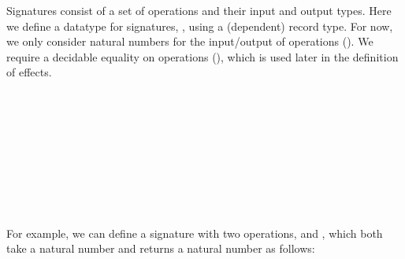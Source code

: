 \documentclass[a4paper,11pt]{article}
\newcommand\fun[1]{{\AgdaFunction{#1}}}
\newcommand\data[1]{{\AgdaFunction{#1}}}
\newcommand\con[1]{{\AgdaInductiveConstructor{#1}}}
\begin{document}
Signatures consist of a set of operations and their input and output types.
Here we define a datatype for signatures, \data{Sig}, using a (dependent) record type.
For now, we only consider natural numbers for the input/output of operations (\data{PTy}).
We require a decidable equality on operations (\fun{decEq}), which is used later in the definition of effects.
\begin{code}%
\>[0]\AgdaSpace{}%
\AgdaSpace{}%
\AgdaSymbol{:}\AgdaSpace{}%
\AgdaSpace{}%
\<%
\\
\>[0][@{}l@{\AgdaIndent{0}}]%
\>[2]\AgdaSpace{}%
\AgdaSymbol{:}\AgdaSpace{}%
\<%
\\
%
\\[\AgdaEmptyExtraSkip]%
\>[0]\AgdaSpace{}%
\AgdaSpace{}%
\AgdaSymbol{:}\AgdaSpace{}%
\AgdaSpace{}%
\<%
\\
\>[0][@{}l@{\AgdaIndent{0}}]%
\>[2]\<%
\\
\>[2][@{}l@{\AgdaIndent{0}}]%
\>[4]\AgdaSpace{}%
\AgdaSymbol{:}\AgdaSpace{}%
\AgdaSpace{}%
\<%
\\
%
\>[4]\AgdaSpace{}%
\AgdaSymbol{:}\AgdaSpace{}%
\AgdaSymbol{(}\AgdaSpace{}%
\AgdaSpace{}%
\AgdaSymbol{:}\AgdaSpace{}%
\AgdaSymbol{)}\AgdaSpace{}%
\AgdaSpace{}%
\AgdaSpace{}%
\AgdaSymbol{(}\AgdaSpace{}%
\AgdaSpace{}%
\AgdaSymbol{)}%
\>[38]\<%
\\
%
\>[4]\AgdaSpace{}%
\AgdaSymbol{:}\AgdaSpace{}%
\AgdaSpace{}%
\AgdaSpace{}%
\AgdaSpace{}%
\<%
\\
%
\>[4]\AgdaSpace{}%
\AgdaSymbol{:}\AgdaSpace{}%
\AgdaSpace{}%
\AgdaSpace{}%
\AgdaSpace{}%
\<%
\end{code}
For example, we can define a signature with two operations, \con{op1} and \con{op2}, which both take a natural number and returns a natural number as follows:
\begin{code}[hide]%
\>[0]\AgdaSpace{}%
\AgdaSpace{}%
\<%
\\
\>[0][@{}l@{\AgdaIndent{0}}]%
\>[2]\AgdaSpace{}%
\<%
\end{code}
\end{document}
